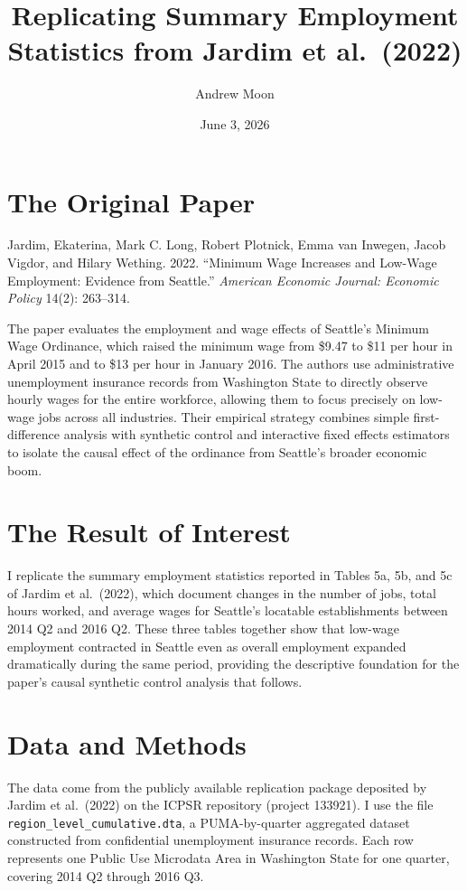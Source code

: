 \documentclass[12pt]{article}
\title{Replicating Summary Employment Statistics from Jardim et al.\ (2022)}
\author{Andrew Moon}
\date{June 3, 2026}
\begin{document}
\maketitle

\section{The Original Paper}

Jardim, Ekaterina, Mark C. Long, Robert Plotnick, Emma van Inwegen, Jacob
Vigdor, and Hilary Wething. 2022. ``Minimum Wage Increases and Low-Wage
Employment: Evidence from Seattle.'' \textit{American Economic Journal:
Economic Policy} 14(2): 263--314.

The paper evaluates the employment and wage effects of Seattle's Minimum Wage
Ordinance, which raised the minimum wage from \$9.47 to \$11 per hour in April
2015 and to \$13 per hour in January 2016. The authors use administrative
unemployment insurance records from Washington State to directly observe hourly
wages for the entire workforce, allowing them to focus precisely on low-wage
jobs across all industries. Their empirical strategy combines simple
first-difference analysis with synthetic control and interactive fixed effects
estimators to isolate the causal effect of the ordinance from Seattle's broader
economic boom.

\section{The Result of Interest}

I replicate the summary employment statistics reported in Tables 5a, 5b, and
5c of Jardim et al.\ (2022), which document changes in the number of jobs,
total hours worked, and average wages for Seattle's locatable establishments
between 2014 Q2 and 2016 Q2. These three tables together show that low-wage
employment contracted in Seattle even as overall employment expanded
dramatically during the same period, providing the descriptive foundation for
the paper's causal synthetic control analysis that follows.

\section{Data and Methods}

The data come from the publicly available replication package deposited by
Jardim et al.\ (2022) on the ICPSR repository (project 133921). I use the file
\texttt{region\_level\_cumulative.dta}, a PUMA-by-quarter aggregated dataset
constructed from confidential unemployment insurance records. Each row
represents one Public Use Microdata Area in Washington State for one quarter,
covering 2014 Q2 through 2016 Q3.
\end{document}
